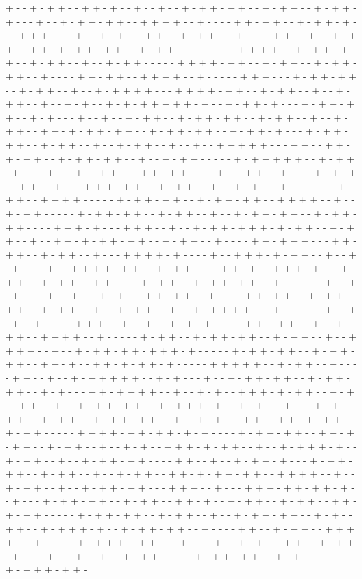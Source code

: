 + - - + - + + - - + + - + - - + - - + - - + - + + - + + - - + - + + - - + - + + - + - - - + - - + - + + - + + - - + + + + - - + - - - - + + - + + - - + - + + - + - - - + + + + - - + - - + - + + - + + - - + - + + - + + - - - - + + - - + - - + - + + - - + + - + - + + - + + - - + - + + - - + - - - - + + + + + - - + - + + - + + - - + - + + - - + - - + - + + - - - - - + + + + - + + - - + - + + - - + - + + - + + - - + - - - - + + - + + - - + + + + - - + - - - - - + + + - - - + - + + - + + - - + - + + - - + - - + - + + + + - - - + + + + - + + - - + - + + - - + - - + - + + - - + - - + - + - - + - + - + + + + + - + - - + - + + - + - - - + - + + - + + - - + - + - - - + - - + - - + - + + - - + - + + - + + - - + - + + - - + - - + - + + - - + + - + - + + - + + - - + - + + - + + - - + - + + - + - - - + - + + - + + - - + - + + - - + - - + - + + - - + - - + - - + + + + + - - - + + - - + + - + - + + - - + - + + - + + - - + - - + - + + - - - - - + - + + + + + - - + - + + - + + - - + - + + - - + + - - - + + - + + - - - - + + - + + - - + - - + + - + - + - - + + - - + - - - + + + - + + - - + - + + - - + - - + - + + - + + - - - - + + - + + - - + + + + - - - - - + - + + - + + - - + - + + - + + - - + + + + - - + - - + - + + - - - - - + - + + - + + - - + - + + - - + - - + - + + - + + - - + - + + - + + - - - - + + + - + - - - + + + - - + - - + - + + - + + + - + - + + - - + - + + - - + - - + + - + - + + - + + - - + - + + - - + - - - - + + - + + + - - - + + - + + - - + - + + - - + - - - + + + + - + - - - - + - - + + + - + - + + - - + - - + - + + - - + - - + + + + - + + - - + - + + - - - - + + - + - - + + + - + - + + - + + - - + - + + - - + + - - - - + - + + - - + - + + - + + - - + - + + - - + - - + - + + - - + - - + - + + - + + - + + - + + - - + - - - - + + - + + - - + - + + - + + - - + - + + - - + - - + - + + - - + - - + - + + + + - - - + - + + - - + - - + - + + + - + - - + + + - - + - - + - - + - + - + - - + - + + + + + - - + - - + - + + - - + + + + - - + - - - - - + - + + - - + - + + - + + - - + - + + - - + - - + + + + - - + - - + - + + - + + - + + + - + - - - - - + - + + - + + - - + - + + - + + - - + + - + - - + + - + - + + - + - - - - - + + + + + - - + - + + - - + - - - - + + - - + - - + - + + + + + - - + - + - - - + - - + - + + - + + - - + - + + - + + - - + - + - - - + + - + + + + - - + - - + - + - - + + + - + - + + - - + - + - - + + - - + - - + - + + - + + - - + - + + + - + - - + - + + - + - - - + - + - - + + - - + - + + - - + - + + - + + - - + - - + - + + - + + - - + + - + - + + - - + - + + - - - - - + + + + - + + - + + - + - + - - - - + - + + - + + - - + + - + - + + - - + - + + - - + - - + - + - - + + + - + - + + - - + - - + - + + + - + - - + - + + - - + - - + - + + - + + - - - - + + - - + - - + - + + - + - - - + - + + - + + - - + - + + - - + - - + - + + - - + + - + - + + - + + - - + + + + - - + - - + - + + - - + - - + - + + - + + - - - + + + - - + - - - + + + - + + - + + - + - - + - - - + - + + - + + - - + - + + - - + + - + - - + - + + - - + - + + - - + + - + - + + - - - - - + - + + - + + - - + - + + - - + - - + - + + - + + - - + - + - - + + - - + - + + + - + - - + - + + - + + - - + - - - - + + - - + - + + - - + + + + - + + - - - - - + - + + + + + + - - - + + - - + - - + - + + - + + - - + - + + - + + - - + - + + - - + - - + - + + - - - - - + - + + - + + - - + - + + - - + - - + - + + + - + + - 